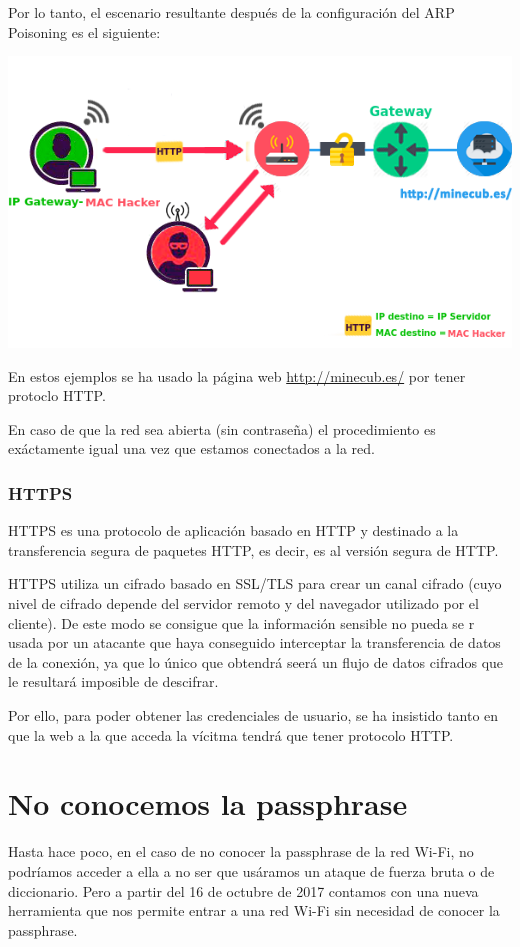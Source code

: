 \newpage
Por lo tanto, el escenario resultante después de la configuración del ARP Poisoning es el siguiente:
\begin{center}
	\includegraphics[scale=0.7]{Escenario.png}
\end{center}

\Nota En estos ejemplos se ha usado la página web \url{http://minecub.es/} por tener protoclo HTTP.

\Nota En caso de que la red sea abierta (sin contraseña) el procedimiento es exáctamente igual una vez que estamos conectados a la red.

\subsubsection{HTTPS}
HTTPS es una protocolo de aplicación basado en HTTP y destinado a la transferencia segura de paquetes HTTP, es decir, es al versión segura de HTTP.

HTTPS utiliza un cifrado basado en SSL/TLS para crear un canal cifrado (cuyo nivel de cifrado depende del servidor remoto y del navegador utilizado por el cliente). De este modo se consigue que la información sensible no pueda se r usada por un atacante que haya conseguido interceptar la transferencia de datos de la conexión, ya que lo único que obtendrá seerá un flujo de datos cifrados que le resultará imposible de descifrar.

Por ello, para poder obtener las credenciales de usuario, se ha insistido tanto en que la web a la que acceda la vícitma tendrá que tener protocolo HTTP.

\section{No conocemos la passphrase}
Hasta hace poco, en el caso de no conocer la passphrase de la red Wi-Fi, no podríamos acceder a ella a no ser que usáramos un ataque de fuerza bruta o de diccionario. Pero a partir del 16 de octubre de 2017 contamos con una nueva herramienta que nos permite entrar a una red Wi-Fi sin necesidad de conocer la passphrase.

